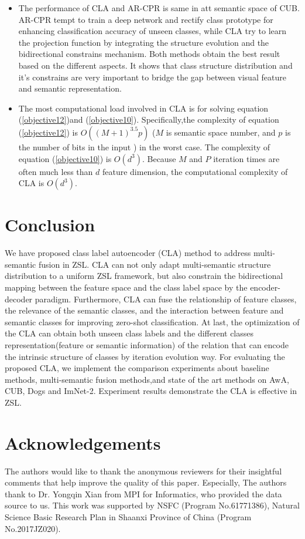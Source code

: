 \documentclass[review]{elsarticle}
\begin{document}
\begin{itemize}
\item The performance of CLA and AR-CPR is same in att semantic space of CUB. AR-CPR tempt to train a deep network and rectify class prototype for enhancing classification accuracy of unseen classes, while CLA try to learn the projection function by integrating the structure evolution and the bidirectional constrains mechanism. Both methods obtain the best result based on the different aspects. It shows that class structure distribution and it's constrains are very important to bridge the gap between visual feature and semantic representation.
\item The most computational load involved in CLA is for solving equation (\ref{objective12})and (\ref{objective10}). Specifically,the complexity of equation (\ref{objective12}) is $O((M+1)^{3.5}p)$ ($M$ is semantic space number, and $p$ is the number of bits in the input \cite{Karmarkar1984A}) in the worst case. The complexity of equation (\ref{objective10}) is $O(d^{3})$. Because $M$ and $P$ iteration times are often much less than $d$ feature dimension, the computational complexity of CLA is $O(d^{3})$.
\end{itemize}

\section{Conclusion}
We have proposed class label autoencoder (CLA) method to address multi-semantic fusion in ZSL. CLA can not only adapt multi-semantic structure distribution to a uniform ZSL framework, but also constrain the bidirectional mapping between the feature space and the class label space by the encoder-decoder paradigm. Furthermore, CLA can fuse the relationship of feature classes, the relevance of the semantic classes, and the interaction between feature and semantic classes for improving zero-shot classification. At last, the optimization of the CLA can obtain both unseen class labels and the different classes representation(feature or semantic information) of the relation that can encode the intrinsic structure of classes by iteration evolution way. For evaluating the proposed CLA, we implement the comparison experiments about baseline methods, multi-semantic fusion methods,and state of the art methods on AwA, CUB, Dogs and ImNet-2. Experiment results demonstrate the CLA is effective in ZSL.


\section{Acknowledgements}
The authors would like to thank the anonymous reviewers for their insightful comments that help improve the quality of this paper. Especially, The authors thank to Dr. Yongqin Xian from MPI for Informatics, who provided the data source to us. This work was supported by NSFC (Program No.61771386), Natural Science Basic Research Plan in Shaanxi Province of China (Program No.2017JZ020).
\end{document}
